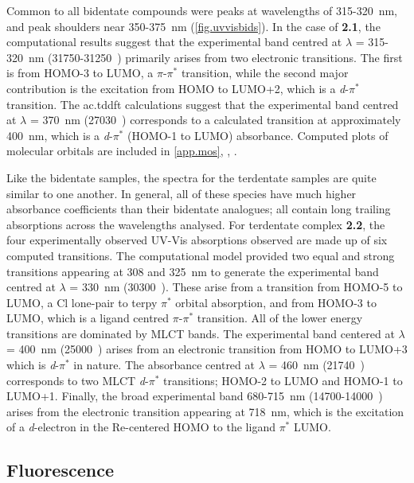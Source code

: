 Common to all bidentate compounds were peaks at wavelengths of 315-320~nm, and peak shoulders near 350-375~nm (\autoref{fig.uvvisbids}). In the case of \textbf{2.1}, the computational results suggest that the experimental band centred at $\lambda$ = 315-320~nm (31750-31250~) primarily arises from two electronic transitions. The first is from HOMO-3 to LUMO, a $\pi$-$\pi^\ast$ transition, while the second major contribution is the excitation from HOMO to LUMO+2, which is a \textit{d}-$\pi^\ast$ transition. The \gls{ac.tddft} calculations suggest that the experimental band centred at $\lambda$ = 370~nm (27030~) corresponds to a calculated transition at approximately 400~nm, which is a \textit{d}-$\pi^\ast$ (HOMO-1 to LUMO) absorbance. Computed plots of molecular orbitals are included in \autoref{app.mos}, , .

Like the bidentate samples, the spectra for the terdentate samples are quite similar to one another. In general, all of these species have much higher absorbance coefficients than their bidentate analogues; all contain long trailing absorptions across the wavelengths analysed. For terdentate complex \textbf{2.2}, the four experimentally observed UV-Vis absorptions observed are made up of six computed transitions. The computational model provided two equal and strong transitions appearing at 308 and 325~nm to generate the experimental band centred at $\lambda$ = 330~nm (30300~). These arise from a transition from HOMO-5 to LUMO, a Cl lone-pair to terpy $\pi^\ast$ orbital absorption, and from HOMO-3 to LUMO, which is a ligand centred $\pi$-$\pi^\ast$ transition. All of the lower energy transitions are dominated by MLCT bands. The experimental band centered at $\lambda$ = 400~nm (25000~) arises from an electronic transition from HOMO to LUMO+3 which is \textit{d}-$\pi^\ast$ in nature. The absorbance centred at $\lambda$ = 460~nm (21740~) corresponds to two MLCT \textit{d}-$\pi^\ast$ transitions; HOMO-2 to LUMO and HOMO-1 to LUMO+1. Finally, the broad experimental band 680-715~nm (14700-14000~) arises from the electronic transition appearing at 718~nm, which is the excitation of a \textit{d}-electron in the Re-centered HOMO to the ligand $\pi^\ast$ LUMO.

\FloatBarrier
\subsection{Fluorescence}\label{ss.fluorescence}

